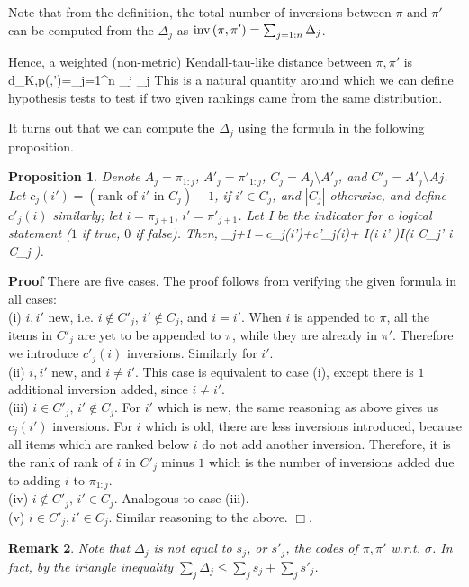 \documentclass[10pt]{article}
\newtheorem{prop}{Proposition}
\newtheorem{remark}[prop]{Remark}
\newcommand\bl{\left(}
\newcommand\br{\right)}
\begin{document}
Note that from the definition, the total number of inversions between $\pi$ and $\pi'$ can be computed from the $\Delta_j$ as $\inv\bl \pi,\pi'\br=\sum_{j=1:n}\Delta_j$.


Hence, a weighted (non-metric) Kendall-tau-like distance between $\pi,\pi'$ is
\beq
d_{K,p}(\pi,\pi')=\sum_{j=1}^{n} \theta_j \Delta_j
\eeq
This is a natural quantity around which we can define hypothesis tests to test if two given rankings came from the same distribution.

It turns out that we can compute the $\Delta_j$ using the formula in the following proposition.

%
\begin{prop} Denote $A_j = \pi_{1:j}$, $A'_j = \pi'_{1:j}$, $C_j=A_j\setminus A'_j$, and $C'_j=A'_j\setminus Aj$. Let $c_j(i')=\bl \text{rank of $i'$ in $C_j$}\br -1$, if $i'\in C_j$, and $|C_j|$ otherwise, and define $c'_j(i)$ similarly; let $i=\pi_{j+1},\,i'=\pi'_{j+1}$. Let I be the indicator for a logical statement ($1$ if true, $0$ if false). Then,
  \beq \label{eq:delta_formula} \Delta_{j+1}\,=\,c_j(i')+c'_j(i)+ I\bl i \neq i' \br I\bl i \notin C_j'  i \notin C_j \br.  \eeq
\end{prop}
%
    {\bf Proof} There are five cases. The proof follows from verifying the given formula in all cases:\\
    (i) $i,i'$ new, i.e. $i\not\in C'_j$, $i'\not\in C_j$, and $i=i'$. When $i$ is appended to $\pi$, all the items in $C'_j$ are yet to be appended to $\pi$, while they are already in $\pi'$. Therefore we introduce $c'_j(i)$ inversions. Similarly for $i'$.\\
    (ii) $i,i'$ new, and $i\neq i'$. This case is equivalent to case (i), except there is $1$ additional inversion added, since $i \neq i'$.\\
    (iii) $i\in C'_j,\,i'\not\in C_j$. For $i'$ which is new, the same reasoning as above gives us $c_j(i')$ inversions. For $i$ which is old, there are less inversions introduced, because all items which are ranked below $i$ do not add another inversion. Therefore, it is the rank of rank of $i$ in $C'_j$ minus $1$ which is the number of inversions added due to adding $i$ to $\pi_{1:j}$.\\
    (iv) $i\notin C'_j,\,i'\in C_j$.
    Analogous to case (iii).\\
    (v) $i\in C'_j,i'\in C_j$. Similar reasoning to the above. $\Box$.
\begin{remark} 
Note that $\Delta_j$ is not equal to $s_j$, or $s'_j$, the codes of $\pi,\pi'$ w.r.t. $\sigma$. In fact, by the triangle inequality $\sum_j\Delta_j\leq \sum_j s_j +\sum_j s'_j$.  
\end{remark}
\end{document}
